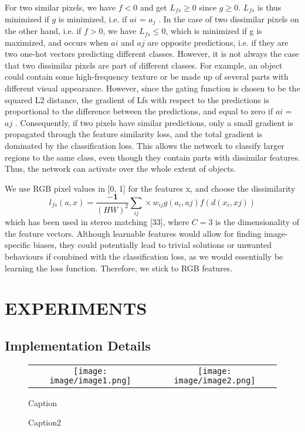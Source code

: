 \documentclass[10pt,twocolumn,letterpaper]{article}
\begin{document}
For two similar pixels, we have $f < 0$ and get $L_{fs} ≥ 0$
since $g ≥ 0$. $L_{fs}$ is thus minimized if $g$ is minimized, i.e. if
$a{i}$ = $a_{j}$ . In the case of two dissimilar pixels on the other
hand, i.e. if $f > 0$, we have $L_{fs} ≤ 0$, which is minimized
if g is maximized, and occurs when $a{i}$ and $a{j}$ are opposite
predictions, i.e. if they are two one-hot vectors predicting
different classes. However, it is not always the case that two
dissimilar pixels are part of different classes. For example,
an object could contain some high-frequency texture or be
made up of several parts with different visual appearance.
However, since the gating function is chosen to be the
squared L2 distance, the gradient of Lfs with respect to
the predictions is proportional to the difference between the
predictions, and equal to zero if $a{i}$ = $a{j}$ . Consequently, if
two pixels have similar predictions, only a small gradient is
propagated through the feature similarity loss, and the total
gradient is dominated by the classification loss. This allows
the network to classify larger regions to the same class, even
though they contain parts with dissimilar features. Thus, the
network can activate over the whole extent of objects.


We use RGB pixel values in [0, 1] for the features x, and
choose the dissimilarity
\begin{equation}
    l_{fs}(a,x) = \frac{-\mathbf{1}}{(HW)^2} \sum_{ij}  \times w_{ij}g(a_{i}, a{j}) f(d(x_{i}, x{j}))  
    \label{eq:my_eq4}
\end{equation}
which has been used in stereo matching [33], where $C = 3$
is the dimensionality of the feature vectors. Although learnable
features would allow for finding image-specific biases,
they could potentially lead to trivial solutions or unwanted
behaviours if combined with the classification loss, as we
would essentially be learning the loss function. Therefore,
we stick to RGB features.


\section{EXPERIMENTS}
\subsection{Implementation Details}


\begin{figure}[H]
    \centering
    \begin{tabular}{cc}
    \texttt{[image: image/image1.png]} &
    \texttt{[image: image/image2.png]} \\
    \end{tabular}
    \caption{Caption}
    \caption{Caption2}
    \label{fig:my_label}
\end{figure}
\end{document}
